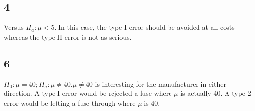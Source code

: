 \documentclass{article}
\begin{document}
	\subsection*{4}	
		Versus $H_a: \mu < 5$. In this case, the type I error should be avoided at all costs whereas the type II error is not as serious.
	\subsection*{6}
		$H_0: \mu  = 40; H_a: \mu \not = 40. \mu \not = 40$ is interesting for the manufacturer in either direction. A type I error would be rejected a fuse where $\mu$ is actually 40. A type 2 error would be letting a fuse through where $\mu$ is 40.
				
				 
	 		
\end{document}
